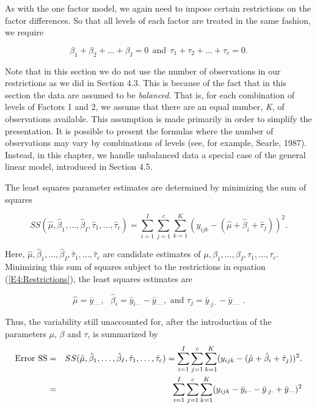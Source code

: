 As with the one factor model, we again need to impose certain
restrictions on the factor differences. So that all levels of each
factor are treated in the same fashion, we require

\begin{equation}\label{E4:Restrictions}
\beta_1 + \beta_2 + \ldots + \beta_I = 0 ~ ~\mathrm{and}~ ~\tau_1 +
\tau_2 + \ldots + \tau_c = 0.
\end{equation}

Note that in this section we do not use the number of observations
in our restrictions as we did in Section 4.3. This is because of the
fact that in this section the data are assumed to be
\textit{balanced}. That is, for each combination of levels of
Factors 1 and 2, we assume that there are an equal number,
\textit{K}, of observations available. This assumption is made
primarily in order to simplify the presentation. It is possible to
present the formulas where the number of observations may vary by
combinations of levels (see, for example, Searle, 1987). Instead, in
this chapter, we handle unbalanced data a special case of the
general linear model, introduced in Section 4.5.

The least squares parameter estimates are determined by minimizing
the sum of squares

\begin{equation*}
SS(\hat{\mu},\hat{\beta}_1,\ldots ,\hat{\beta}_{I},
\hat{\tau}_1,\ldots
,\hat{\tau}_{c})=\sum_{i=1}^{I}\sum_{j=1}^{c}\sum_{k=1}^{K}(y_{ijk}-(\hat{\mu}+
\hat{\beta}_i+\hat{\tau}_{j}))^{2}.
\end{equation*}

\noindent Here, $\hat{\mu},\hat{\beta}_1,\ldots
,\hat{\beta}_{I},\hat{\tau}_1,\ldots ,\hat{\tau}_{c}$ are candidate
estimates of $\mu ,\beta_1,\ldots ,\beta_I,\tau _1,\ldots ,\tau_c$.
Minimizing this sum of squares subject to the restrictions in
equation (\ref{E4:Restrictions}), the least squares estimates are

\begin{equation}  \label{E4:TwoFactorEstimates}
\hat{\mu}=\bar{y}_{\cdot \cdot \cdot },\text{ \ \ }\hat{\beta}_i=\bar{y}%
_{i\cdot \cdot }-\bar{y}_{\cdot \cdot \cdot },\text{ \ and }\hat{\tau}_{j}=%
\bar{y}_{\cdot j\cdot }-\bar{y}_{\cdot \cdot \cdot }\text{ .}
\end{equation}

Thus, the variability still unaccounted for, after the introduction
of the
parameters $\mu $, $\beta $ and $\tau $, is summarized by%
\begin{eqnarray}\label{E4:TwoFactorErrorSS}
\text{Error SS} &=&SS(\hat{\mu},\hat{\beta}_1,\ldots ,\hat{\beta}_{I},\hat{%
\tau}_1,\ldots ,\hat{\tau}_{c})=\sum_{i=1}^{I}\sum_{j=1}^{c}%
\sum_{k=1}^{K}(y_{ijk}-(\hat{\mu}+\hat{\beta}_i+\hat{\tau}_{j}))^{2}.
\notag \\
&=&\sum_{i=1}^{I}\sum_{j=1}^{c}\sum_{k=1}^{K}(y_{ijk}-\bar{y}_{i\cdot
\cdot }-\bar{y}_{\cdot j\cdot }+\bar{y}_{\cdot \cdot \cdot })^{2}
\end{eqnarray}

